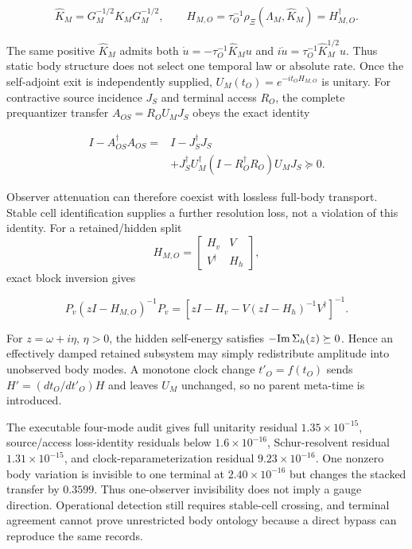 \documentclass[11pt]{article}
\begin{document}
\begin{equation}
 \widehat K_M=G_M^{-1/2}K_MG_M^{-1/2},\qquad
 H_{M,O}=\tau_O^{-1}\rho_\Xi(\Lambda_M,\widehat K_M)
        =H_{M,O}^\dagger.
 \label{eq:atemporal-body-generator}
\end{equation}

The same positive \(\widehat K_M\) admits both
\(\dot u=-\tau_O^{-1}\widehat K_Mu\) and
\(i\dot u=\tau_O^{-1}\widehat K_M^{1/2}u\). Thus static body structure
does not select one temporal law or absolute rate. Once the self-adjoint exit
is independently supplied, \(U_M(t_O)=e^{-it_OH_{M,O}}\) is unitary. For
contractive source incidence \(J_S\) and terminal access \(R_O\), the complete
prequantizer transfer \(A_{OS}=R_OU_MJ_S\) obeys the exact identity

\begin{equation}
\begin{split}
 I-A_{OS}^\dagger A_{OS}
={}&I-J_S^\dagger J_S\\
 &+J_S^\dagger U_M^\dagger
 (I-R_O^\dagger R_O)U_MJ_S\succeq0.
\end{split}
\label{eq:atemporal-body-loss-identity}
\end{equation}

Observer attenuation can therefore coexist with lossless full-body
transport. Stable cell identification supplies a further resolution loss,
not a violation of this identity. For a retained/hidden split
\[
H_{M,O}=\begin{bmatrix}H_v&V\\V^\dagger&H_h\end{bmatrix},
\]
exact block inversion gives

\begin{equation}
 P_v(zI-H_{M,O})^{-1}P_v
 =\left[zI-H_v-V(zI-H_h)^{-1}V^\dagger\right]^{-1}.
\label{eq:atemporal-body-schur-loss}
\end{equation}

For \(z=\omega+i\eta\), \(\eta>0\), the hidden self-energy satisfies
\(-{\rm Im}\,\Sigma_h(z)\succeq0\). Hence an effectively damped retained
subsystem may simply redistribute amplitude into unobserved body modes. A
monotone clock change \(t'_O=f(t_O)\) sends
\(H'=(dt_O/dt'_O)H\) and leaves \(U_M\) unchanged, so no parent meta-time is
introduced.

The executable four-mode audit gives full unitarity residual
\(1.35\times10^{-15}\), source/access loss-identity residuals below
\(1.6\times10^{-16}\), Schur-resolvent residual
\(1.31\times10^{-15}\), and clock-reparameterization residual
\(9.23\times10^{-16}\). One nonzero body variation is invisible to one
terminal at \(2.40\times10^{-16}\) but changes the stacked transfer by
\(0.3599\). Thus one-observer invisibility does not imply a gauge direction.
Operational detection still requires stable-cell crossing, and terminal
agreement cannot prove unrestricted body ontology because a direct bypass
can reproduce the same records.
\end{document}
